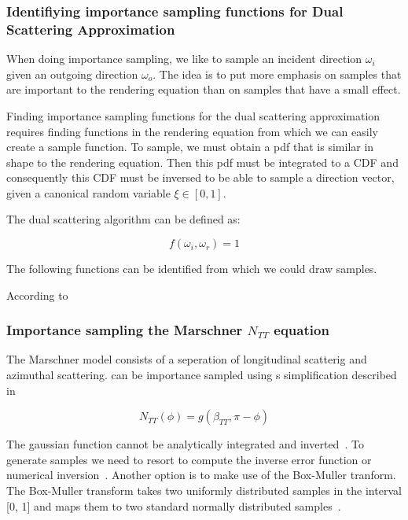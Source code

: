 \documentclass[12pt,a4paper,twoside]{article}
\begin{document}
\subsubsection*{Identifiying importance sampling functions for Dual Scattering Approximation}
When doing importance sampling, we like to sample an incident direction $\omega_i$ given an outgoing direction $\omega_o$. The idea is to put more emphasis on samples that are important to the rendering equation than on samples that have a small effect.

Finding importance sampling functions for the dual scattering approximation requires finding functions in the rendering equation from which we can easily create a sample function.
To sample, we must obtain a pdf that is similar in shape to the rendering equation. Then this pdf must be integrated to a CDF and consequently this CDF must be inversed to be able to sample a direction vector, given a canonical random variable $\xi \in [0, 1]$.

The dual scattering algorithm can be defined as:

\begin{equation}
f(\omega_i, \omega_r) = 1
\end{equation}

The following functions can be identified from which we could draw samples.

According to~\cite{companion} 

\subsubsection*{Importance sampling the Marschner $N_{TT}$ equation}

The Marschner model consists of a seperation of longitudinal scatterig and azimuthal scattering. can be importance sampled using s simplification described in~\cite{sadeghi:10} 

\begin{equation}
N_{TT}(\phi) = g(\beta_{TT}, \pi - \phi)
\end{equation}

The gaussian function cannot be analytically integrated and inverted~\cite{pixarmemo}. To generate samples we need to resort to compute the inverse error function or numerical inversion~\cite{pixarmemo}. Another option is to make use of the Box-Muller tranform. The Box-Muller transform takes two uniformly distributed samples in the interval [0, 1] and maps them to two standard normally distributed samples~\cite{box-muller}.
\end{document}

